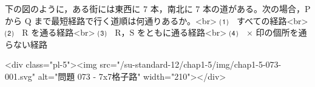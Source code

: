下の図のように，ある街には東西に $7$ 本，南北に $7$ 本の道がある。次の場合，$\mathrm{P}$ から $\mathrm{Q}$ まで最短経路で行く道順は何通りあるか。<br>
⑴　すべての経路<br>
⑵　$\mathrm{R}$ を通る経路<br>
⑶　$\mathrm{R}$，$\mathrm{S}$ をともに通る経路<br>
⑷　$\times$ 印の個所を通らない経路

<div class="pl-5"><img src="/su-standard-12/chap1-5/img/chap1-5-073-001.svg" alt="問題 073 - 7x7格子路" width="210"></div>
